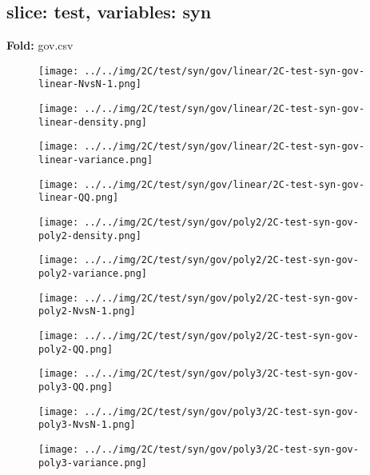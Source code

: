 \subsection{slice: test, variables: syn}
\textbf{Fold:} gov.csv
\begin{figure}[H]
\centering	\texttt{[image: ../../img/2C/test/syn/gov/linear/2C-test-syn-gov-linear-NvsN-1.png]}
\end{figure}
\begin{figure}[H]
\centering	\texttt{[image: ../../img/2C/test/syn/gov/linear/2C-test-syn-gov-linear-density.png]}
\end{figure}
\begin{figure}[H]
\centering	\texttt{[image: ../../img/2C/test/syn/gov/linear/2C-test-syn-gov-linear-variance.png]}
\end{figure}
\begin{figure}[H]
\centering	\texttt{[image: ../../img/2C/test/syn/gov/linear/2C-test-syn-gov-linear-QQ.png]}
\end{figure}
\begin{figure}[H]
\centering	\texttt{[image: ../../img/2C/test/syn/gov/poly2/2C-test-syn-gov-poly2-density.png]}
\end{figure}
\begin{figure}[H]
\centering	\texttt{[image: ../../img/2C/test/syn/gov/poly2/2C-test-syn-gov-poly2-variance.png]}
\end{figure}
\begin{figure}[H]
\centering	\texttt{[image: ../../img/2C/test/syn/gov/poly2/2C-test-syn-gov-poly2-NvsN-1.png]}
\end{figure}
\begin{figure}[H]
\centering	\texttt{[image: ../../img/2C/test/syn/gov/poly2/2C-test-syn-gov-poly2-QQ.png]}
\end{figure}
\begin{figure}[H]
\centering	\texttt{[image: ../../img/2C/test/syn/gov/poly3/2C-test-syn-gov-poly3-QQ.png]}
\end{figure}
\begin{figure}[H]
\centering	\texttt{[image: ../../img/2C/test/syn/gov/poly3/2C-test-syn-gov-poly3-NvsN-1.png]}
\end{figure}
\begin{figure}[H]
\centering	\texttt{[image: ../../img/2C/test/syn/gov/poly3/2C-test-syn-gov-poly3-variance.png]}
\end{figure}
